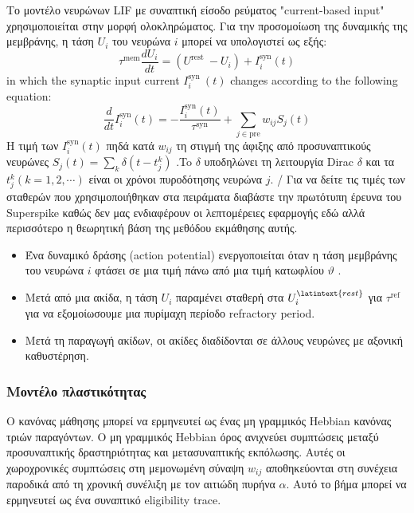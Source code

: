 \documentclass[12pt]{report}
\begin{document}
Το μοντέλο νευρώνων \textlatin{LIF} με συναπτική είσοδο ρεύματος \textlatin{"current-based input"} χρησιμοποιείται στην μορφή ολοκληρώματος. Για την προσομοίωση της δυναμικής της μεμβράνης, η τάση $U_{i}$ του νευρώνα $i$ μπορεί να υπολογιστεί ως εξής:
\begin{equation}
\label{eqn:lifvoltage}
\tau^{\mathrm{mem}} \frac{d U_{i}}{d t}=\left(U^{\text {rest }}-U_{i}\right)+I_{i}^{\mathrm{syn}}(t)
\end{equation}
in which the synaptic input current $I_{i}^{\text {syn }}(t)$ changes according to the following equation:
\begin{equation}
\frac{d}{d t} I_{i}^{\mathrm{syn}}(t)=-\frac{I_{i}^{\mathrm{syn}}(t)}{\tau^{\mathrm{syn}}}+\sum_{j \in \mathrm{pre}} w_{i j} S_{j}(t)
\end{equation}
Η τιμή των $I_{i}^{\mathrm{syn}}(t)$ πηδά κατά $w_{i j}$ τη στιγμή της άφιξης από προσυναπτικούς νευρώνες $S_{j}(t)=\sum_{k} \delta\left(t-t_{j}^{k}\right)$ .To $\delta$ υποδηλώνει τη λειτουργία \textlatin{Dirac} $\delta$ και τα $t_{j}^{k}(k=1,2, \cdots)$ είναι οι χρόνοι πυροδότησης νευρώνα $j .$ / Για να δείτε τις τιμές των σταθερών που χρησιμοποιήθηκαν στα πειράματα διαβάστε την πρωτότυπη έρευνα του \textlatin{Superspike} καθώς δεν μας ενδιαφέρουν οι λεπτομέρειες εφαρμογής εδώ αλλά περισσότερο η θεωρητική βάση της μεθόδου εκμάθησης αυτής.

\begin{itemize}
    \item Ένα δυναμικό δράσης (\textlatin{action potential}) ενεργοποιείται όταν η τάση μεμβράνης του νευρώνα $i$ φτάσει σε μια τιμή πάνω από μια τιμή κατωφλίου $\vartheta$ .
    \item Μετά από μια ακίδα, η τάση $U_{i}$ παραμένει σταθερή στα $U_{i}^{\latintext {rest }}$ για $\tau^{\mathrm{ref}}$ για να εξομοίωσουμε μια πυρίμαχη περίοδο \textlatin{refractory period}.
    \item  Μετά τη παραγωγή ακίδων, οι ακίδες διαδίδονται σε άλλους νευρώνες με αξονική καθυστέρηση.
\end{itemize}


\subsubsection{Μοντέλο πλαστικότητας}

Ο κανόνας μάθησης μπορεί να ερμηνευτεί ως ένας μη γραμμικός \textlatin{ Hebbian} κανόνας τριών παραγόντων. Ο μη γραμμικός \textlatin{ Hebbian} όρος ανιχνεύει συμπτώσεις μεταξύ προσυναπτικής δραστηριότητας και μετασυναπτικής εκπόλωσης. Αυτές οι χωροχρονικές συμπτώσεις στη μεμονωμένη σύναψη  $w_{i j}$ αποθηκεύονται στη συνέχεια παροδικά από τη χρονική συνέλιξη με τον αιτιώδη πυρήνα $\alpha$. Αυτό το βήμα μπορεί να ερμηνευτεί ως ένα συναπτικό \textlatin{eligibility trace}.
\end{document}
